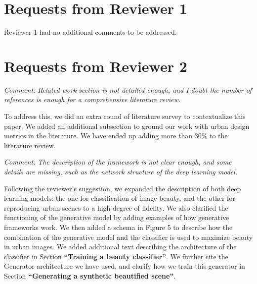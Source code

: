 \documentclass{paper}
\newenvironment{myquote}
{\definecolor{shadecolor}{rgb}{0.9,0.95,1} \begin{shaded*} \sf \em}
{\em\end{shaded*}}
\begin{document}
\section*{Requests from Reviewer 1}

\noindent Reviewer 1 had no additional comments to be addressed.

\section*{Requests from Reviewer 2}

\begin{myquote}
\noindent Comment: Related work section is not detailed enough, and I doubt the number of references is enough for a comprehensive literature review.
\end{myquote}

\noindent To address this, we did an extra round of literature survey to  contextualize this paper. We added an additional subsection to ground our work with urban design metrics in the literature. We have ended up adding more than 30\% to the literature review. 


\begin{myquote}
\noindent Comment: The description of the framework is not clear enough, and some details are missing, such as the network structure of the deep learning model.
\end{myquote}

\noindent Following the reviewer's suggestion, we expanded the description of both deep learning models: the one for classification of image beauty, and the other for reproducing urban scenes to a high degree of fidelity. We also clarified the functioning of the generative model by adding examples of how generative frameworks work. We then added a schema in Figure 5 to describe how the combination of the generative model and the classifier is used to maximize beauty in urban images. We added additional text describing the architecture of the classifier in Section \textbf{``Training a beauty classifier''}. We further cite the Generator architecture we have used, and clarify how we train this generator in Section \textbf{``Generating a synthetic beautified scene''}.
\end{document}
